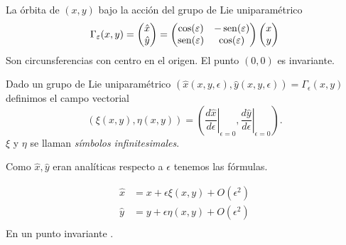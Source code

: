 \begin{ejemplo}{} La órbita de $(x,y)$ bajo la acción del grupo  de Lie uniparamétrico
\[
\Gamma_{\varepsilon}(x,y)= \begin{pmatrix} \hat{x}\\ \hat{y}
\end{pmatrix}=\begin{pmatrix} \cos(\varepsilon) & -\operatorname{sen}(\varepsilon)
\\ \operatorname{sen}(\varepsilon) & \cos(\varepsilon)
\end{pmatrix} \begin{pmatrix} x\\ y
\end{pmatrix}
\]
Son circunsferencias con centro en el origen. El punto $(0,0)$ es invariante.

\end{ejemplo}


\begin{definicion}
 Dado un grupo de Lie uniparamétrico $(\hat{x}(x,y,\epsilon),\hat{y}(x,y,\epsilon))=\Gamma_{\epsilon}(x,y)$  definimos el campo vectorial
\[(\xi(x,y),\eta(x, y))=\left(\left.\frac{d\hat{x}}{d\epsilon}\right|_{\epsilon=0}, \left.\frac{d\hat{y}}{d\epsilon}\right|_{\epsilon=0}   \right).\]
 $\xi$ y $\eta$ se llaman \emph{símbolos infinitesimales}.
 
 
Como $\hat{x},\hat{y}$ eran analíticas respecto a $\epsilon$ tenemos las fórmulas.

 
 \begin{equation}\label{eq:des_serie_infi}
\begin{array}{cc}
\hat{x}&=x+\epsilon\xi(x,y)+O(\epsilon^2)\\
\hat{y}&=y+\epsilon\eta(x,y)+O(\epsilon^2)\\
\end{array}
\end{equation}
 En un punto invariante .
 
\end{definicion}





